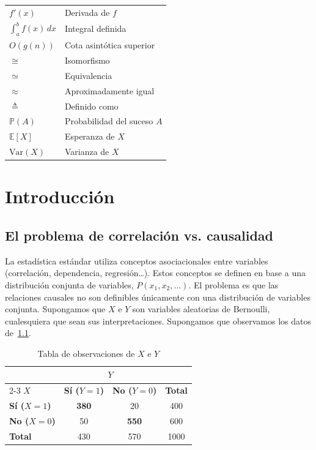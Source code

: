 \documentclass[a4paper,11pt,spanish, twoside]{tfg-uam-matematicas_25-26}
\theoremstyle{definition}
\begin{document}
\begin{tabular}{ll}
$f'(x)$ & Derivada de $f$ \\
$\int_a^b f(x)\,dx$ & Integral definida \\
$O(g(n))$ & Cota asintótica superior \\
$\cong$ & Isomorfismo \\
$\simeq$ & Equivalencia \\
$\approx$ & Aproximadamente igual \\
$\triangleq$ & Definido como \\
$\mathbb{P}(A)$ & Probabilidad del suceso $A$ \\
$\mathbb{E}[X]$ & Esperanza de $X$ \\
$\mathrm{Var}(X)$ & Varianza de $X$ \\
\end{tabular}
\cleardoublepage

\mainmatter


\chapter{Introducción}\label{chap1}



\section{El problema de correlación vs. causalidad}
La estadística estándar utiliza conceptos asociacionales entre variables (correlación, dependencia, regresión\ldots). Estos conceptos se definen en base a una distribución conjunta de variables, $P(x_1, x_2, \ldots)$. El problema es que las relaciones causales no son definibles únicamente con una distribución de variables conjunta. Supongamos que $X$ e $Y$ son variables aleatorias de Bernoulli, cualesquiera que sean sus interpretaciones. Supongamos que observamos los datos de~\ref{tab:correlacion_simple}.

\begin{table}[h]
    \centering
    \begin{tabular}{lccc}
        \toprule
         & \multicolumn{2}{c}{\textbf{$Y$}} & \\
        \cmidrule(lr){2-3}
        \textbf{$X$} & \textbf{Sí ($Y=1$)} & \textbf{No ($Y=0$)} & \textbf{Total} \\
        \midrule
        \textbf{Sí ($X=1$)} & \textbf{380} & 20 & 400 \\
        \textbf{No ($X=0$)} & 50 & \textbf{550} & 600 \\
        \midrule
        \textbf{Total} & 430 & 570 & 1000 \\
        \bottomrule
    \end{tabular}
    \caption{Tabla de observaciones de $X$ e $Y$}
    \label{tab:correlacion_simple}
\end{table}
\end{document}
